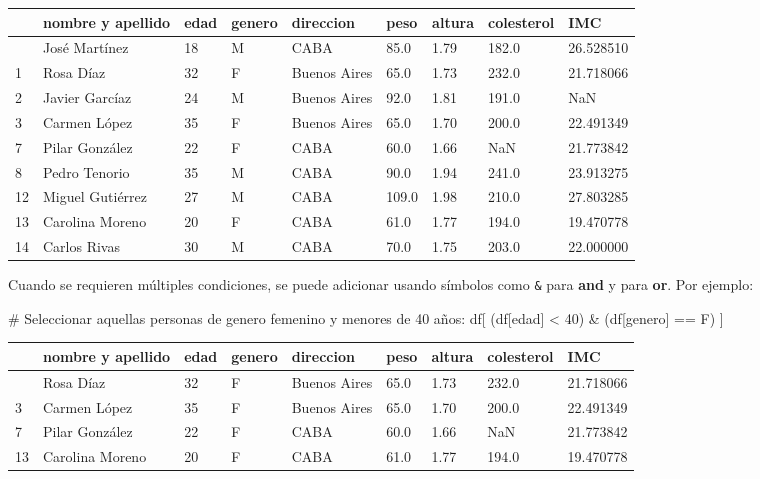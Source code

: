 \documentclass[
  letterpaper,
  DIV=11,
  numbers=noendperiod]{scrreprt}
\newenvironment{Shaded}{\begin{snugshade}}{\end{snugshade}}
\newcommand{\CommentTok}[1]{\textcolor[rgb]{0.37,0.37,0.37}{#1}}
\newcommand{\DecValTok}[1]{\textcolor[rgb]{0.68,0.00,0.00}{#1}}
\newcommand{\NormalTok}[1]{\textcolor[rgb]{0.00,0.23,0.31}{#1}}
\newcommand{\OperatorTok}[1]{\textcolor[rgb]{0.37,0.37,0.37}{#1}}
\newcommand{\StringTok}[1]{\textcolor[rgb]{0.13,0.47,0.30}{#1}}
\begin{document}
\begin{longtable}[]{@{}lllllllll@{}}
\toprule\noalign{}
& nombre y apellido & edad & genero & direccion & peso & altura &
colesterol & IMC \\
\midrule\noalign{}
\endhead
\bottomrule\noalign{}
\endlastfoot
0 & José Martínez & 18 & M & CABA & 85.0 & 1.79 & 182.0 & 26.528510 \\
1 & Rosa Díaz & 32 & F & Buenos Aires & 65.0 & 1.73 & 232.0 &
21.718066 \\
2 & Javier Garcíaz & 24 & M & Buenos Aires & 92.0 & 1.81 & 191.0 &
NaN \\
3 & Carmen López & 35 & F & Buenos Aires & 65.0 & 1.70 & 200.0 &
22.491349 \\
7 & Pilar González & 22 & F & CABA & 60.0 & 1.66 & NaN & 21.773842 \\
8 & Pedro Tenorio & 35 & M & CABA & 90.0 & 1.94 & 241.0 & 23.913275 \\
12 & Miguel Gutiérrez & 27 & M & CABA & 109.0 & 1.98 & 210.0 &
27.803285 \\
13 & Carolina Moreno & 20 & F & CABA & 61.0 & 1.77 & 194.0 &
19.470778 \\
14 & Carlos Rivas & 30 & M & CABA & 70.0 & 1.75 & 203.0 & 22.000000 \\
\end{longtable}

Cuando se requieren múltiples condiciones, se puede adicionar usando
símbolos como \texttt{\&} para \textbf{and} y \texttt{\textbar{}} para
\textbf{or}. Por ejemplo:

\begin{Shaded}
\begin{Highlighting}[]
\CommentTok{\# Seleccionar aquellas personas de genero femenino y menores de 40 años:}
\NormalTok{df[ (df[}\StringTok{\textquotesingle{}edad\textquotesingle{}}\NormalTok{] }\OperatorTok{\textless{}} \DecValTok{40}\NormalTok{) }\OperatorTok{\&}\NormalTok{ (df[}\StringTok{\textquotesingle{}genero\textquotesingle{}}\NormalTok{] }\OperatorTok{==} \StringTok{\textquotesingle{}F\textquotesingle{}}\NormalTok{) ]}
\end{Highlighting}
\end{Shaded}

\begin{longtable}[]{@{}lllllllll@{}}
\toprule\noalign{}
& nombre y apellido & edad & genero & direccion & peso & altura &
colesterol & IMC \\
\midrule\noalign{}
\endhead
\bottomrule\noalign{}
\endlastfoot
1 & Rosa Díaz & 32 & F & Buenos Aires & 65.0 & 1.73 & 232.0 &
21.718066 \\
3 & Carmen López & 35 & F & Buenos Aires & 65.0 & 1.70 & 200.0 &
22.491349 \\
7 & Pilar González & 22 & F & CABA & 60.0 & 1.66 & NaN & 21.773842 \\
13 & Carolina Moreno & 20 & F & CABA & 61.0 & 1.77 & 194.0 &
19.470778 \\
\end{longtable}
\end{document}
